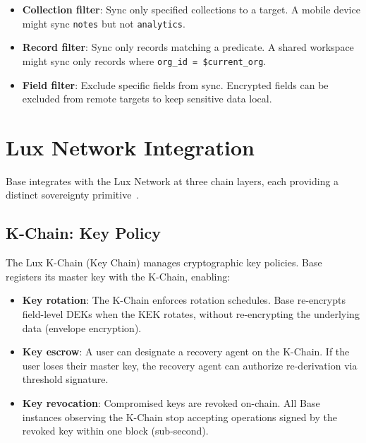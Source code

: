 \documentclass[11pt]{article}
\begin{document}
\begin{itemize}[leftmargin=1.1em]
    \item \textbf{Collection filter}: Sync only specified collections to a
    target. A mobile device might sync \texttt{notes} but not
    \texttt{analytics}.
    \item \textbf{Record filter}: Sync only records matching a predicate.
    A shared workspace might sync only records where
    \texttt{org\_id = \$current\_org}.
    \item \textbf{Field filter}: Exclude specific fields from sync. Encrypted
    fields can be excluded from remote targets to keep sensitive data local.
\end{itemize}

\section{Lux Network Integration}
\label{sec:lux}

Base integrates with the Lux Network at three chain layers, each providing a
distinct sovereignty primitive~\cite{luxwhitepaper, luxtrust, luxapp}.

\subsection{K-Chain: Key Policy}

The Lux K-Chain (Key Chain) manages cryptographic key policies. Base registers
its master key with the K-Chain, enabling:

\begin{itemize}[leftmargin=1.1em]
    \item \textbf{Key rotation}: The K-Chain enforces rotation schedules. Base
    re-encrypts field-level DEKs when the KEK rotates, without re-encrypting
    the underlying data (envelope encryption).
    \item \textbf{Key escrow}: A user can designate a recovery agent on the
    K-Chain. If the user loses their master key, the recovery agent can
    authorize re-derivation via threshold signature.
    \item \textbf{Key revocation}: Compromised keys are revoked on-chain.
    All Base instances observing the K-Chain stop accepting operations signed
    by the revoked key within one block (sub-second).
\end{itemize}
\end{document}
